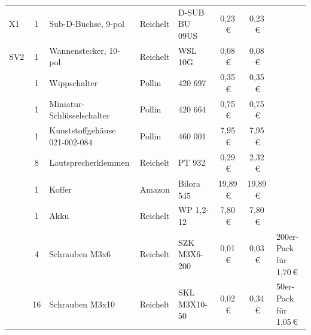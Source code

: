 \documentclass[paper=a4, parskip, numbers=noenddot, toc=listof, headsepline]{scrbook}
\begin{document}
{\begin{longtabu}{p{1.2cm}cXllSSp{2.35cm}}
					X1                                      & 1    & Sub-D-Buchse, 9-pol                       & Reichelt   & D-SUB BU 09US                                                        & 0,23\,€  & 0,23\,€  &                        \\
					SV2                                     & 1    & Wannenstecker, 10-pol                     & Reichelt   & WSL 10G                                                              & 0,08\,€  & 0,08\,€  &                        \\
					                                        & 1    & Wippschalter                              & Pollin     & 420 697                                                              & 0,35\,€  & 0,35\,€  &                        \\
					                                        & 1    & Miniatur-Schlüsselschalter                & Pollin     & 420 664                                                              & 0,75\,€  & 0,75\,€  &                        \\
					                                        & 1    & Kunststoffgehäuse 021-002-084             & Pollin     & 460 001                                                              & 7,95\,€  & 7,95\,€  &                        \\
					                                        & 8    & Laut\-sprech\-er\-klem\-men               & Reichelt   & PT 932                                                               & 0,29\,€  & 2,32\,€  &                        \\
					                                        & 1    & Koffer                                    & Amazon     & Bilora 545                                                           & 19,89\,€ & 19,89\,€ &                        \\
					                                        & 1    & Akku                                      & Reichelt   & WP 1,2-12                                                            & 7,80\,€  & 7,80\,€  &                        \\
					                                        & 4    & Schrauben M3x6                            & Reichelt   & SZK M3X6-200                                                         & 0,01\,€  & 0,03\,€  & 200er-Pack für 1,70\,€ \\
					                                        & 16   & Schrauben M3x10                           & Reichelt   & SKL M3X10-50                                                         & 0,02\,€  & 0,34\,€  & 50er-Pack für 1,05\,€  \\

\end{longtabu}}
\end{document}
